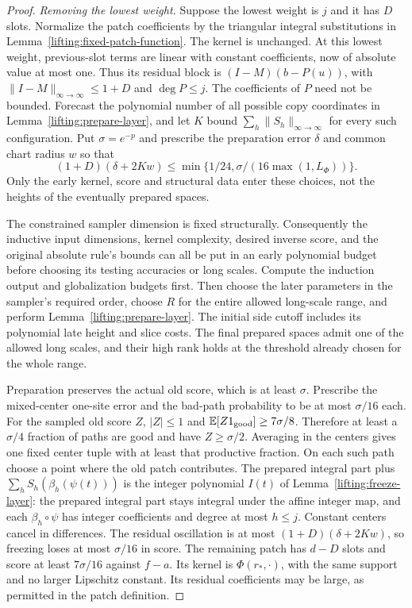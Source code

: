 \begin{proof}
\emph{Removing the lowest weight.}
Suppose the lowest weight is $j$ and it has $D$ slots.  Normalize the
patch coefficients by the triangular integral substitutions in
Lemma~\ref{lifting:fixed-patch-function}.  The kernel is unchanged.
At this lowest weight, previous-slot terms are linear with constant
coefficients, now of absolute value at most one.  Thus its residual
block is $(I-M)(b-P(u))$, with
$\|I-M\|_{\infty\to\infty}\le1+D$ and $\deg P\le j$.
The coefficients of $P$ need not be bounded.
Forecast the polynomial number of all possible copy coordinates in
Lemma~\ref{lifting:prepare-layer}, and let $K$ bound
$\sum_h\|S_h\|_{\infty\to\infty}$ for every such configuration.
Put $\sigma=e^{-p}$ and prescribe the preparation error $\delta$
and common chart radius $w$ so that
\[
 (1+D)(\delta+2Kw)
 \le \min\{1/24,\sigma/(16\max(1,L_\Phi))\}.
\]
Only the early kernel, score and structural data enter these
choices, not the heights of the eventually prepared spaces.

The constrained sampler dimension is fixed structurally.  Consequently
the inductive input dimensions, kernel complexity, desired inverse
score, and the original absolute rule's bounds can all be put in an
early polynomial budget before choosing its testing accuracies or
long scales.  Compute the induction output and globalization budgets
first.  Then choose the later parameters in the sampler's required
order, choose $R$ for the entire allowed long-scale range, and
perform Lemma~\ref{lifting:prepare-layer}.  The initial side cutoff
includes its polynomial late height and slice costs.  The final
prepared spaces admit one of the allowed long scales, and their
high rank holds at the threshold already chosen for the whole range.

Preparation preserves the actual old score, which is at least
$\sigma$.  Prescribe the mixed-center one-site error and the bad-path
probability to be at most $\sigma/16$ each.  For the sampled old
score $Z$, $|Z|\le1$ and
$\mathbb E[Z1_{\rm good}]\ge7\sigma/8$.  Therefore at least a
$\sigma/4$ fraction of paths are good and have $Z\ge\sigma/2$.
Averaging in the centers gives one fixed center tuple with at least
that productive fraction.  On each such path
choose a point where the old patch contributes.  The prepared
integral part plus $\sum_h S_h(\beta_h(\psi(t)))$ is the integer polynomial
$I(t)$ of Lemma~\ref{lifting:freeze-layer}: the prepared integral
part stays integral under the affine integer map, and each
$\beta_h\circ\psi$ has integer coefficients and degree at most
$h\le j$.  Constant centers cancel in differences.  The residual
oscillation is at most $(1+D)(\delta+2Kw)$, so freezing loses at
most $\sigma/16$ in score.  The remaining patch has $d-D$ slots
and score at least $7\sigma/16$ against $f-a$.  Its kernel is
$\Phi(r_*,\cdot)$, with the same support and no larger Lipschitz
constant.  Its residual coefficients may be large, as permitted
in the patch definition.


\end{proof}
